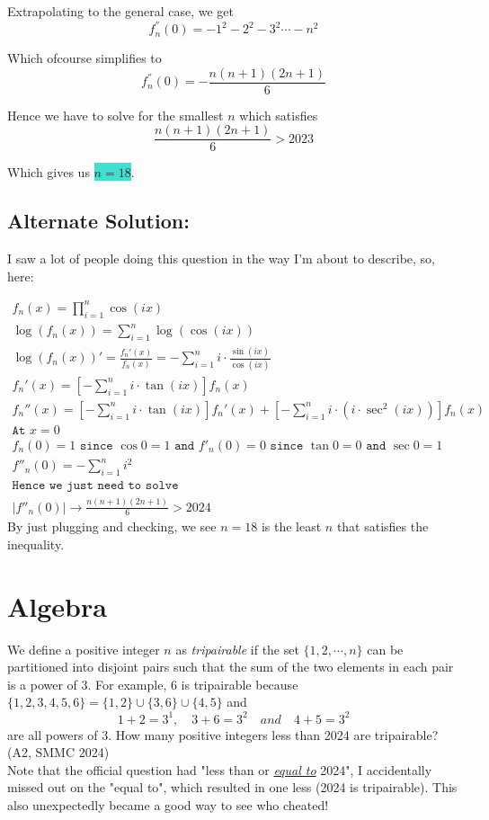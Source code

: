 \documentclass[12pt, letterpaper]{article}
\begin{document}
Extrapolating to the general case, we get \[
f_n^{''}(0) = -1^2 -2^2 - 3^2 \cdots - n^2
\]

Which ofcourse simplifies to \[
f_n^{''}(0) = -\frac{n(n+1)(2n+1)}{6}
\]

Hence we have to solve for the smallest $n$ which satisfies
\[
\frac{n(n+1)(2n+1)}{6} > 2023
\]

Which gives us \colorbox{Turquoise}{$n=18$}.

\subsection*{Alternate Solution:}
I saw a lot of people doing this question in the way I'm about to describe, so, here:

\setlength{\jot}{6pt}
\begin{align*}  
f_n(x) = \prod_{i=1}^n\cos(ix) \\
\log{(f_n(x))} = \sum_{i=1}^{n}\log{(\cos{(ix)})}\\
\log{(f_n(x))}'=\frac{f_n'(x)}{f_n(x)}=-\sum_{i=1}^ni\cdot\frac{\sin(ix)}{\cos{(ix)}}\\
f_n'(x) = \left[-\sum_{i=1}^ni\cdot\tan{(ix)}\right]f_n(x)\\
f_n''(x) = \left[-\sum_{i=1}^ni\cdot\tan{(ix)}\right]f_n'(x) + \left[-\sum_{i=1}^ni\cdot (i\cdot\sec^2{(ix)})\right]f_n(x)\\
\texttt{At $x=0$}\\
\texttt{$f_n(0)=1$ since $\cos{0}=1$ and $f'_n(0)=0$ since $\tan{0}=0$ and $\sec{0}=1$}\\
f''_n(0)=-\sum_{i=1}^ni^2\\
\texttt{Hence we just need to solve}\\
|f''_n(0)|\rightarrow\frac{n(n+1)(2n+1)}{6} > 2024
\end{align*}
By just plugging and checking, we see $n=18$ is the least $n$ that satisfies the inequality.

\newpage

\section{Algebra} 
We define a positive integer $n$ as \textit{tripairable} if the set $\{1,2,\cdots,n\}$ can be partitioned into disjoint pairs such that the sum of the two elements in each pair is a power of 3. For example, 6 is tripairable because \(\{1,2,3,4,5,6\} = \{1,2\} \cup \{3,6\} \cup \{4,5\} \) and \[1+2=3^1, \quad 3+6=3^2 \quad and \quad 4+5=3^2\] are all powers of 3.
How many positive integers less than 2024 are tripairable? {\color{gray} (A2, SMMC 2024)}\\
Note that the official question had "less than or \underline{\textit{equal to}}
2024", I accidentally missed out on the "equal to", which resulted in one less (2024 is tripairable). This also unexpectedly became a good way to see who cheated!
\end{document}
